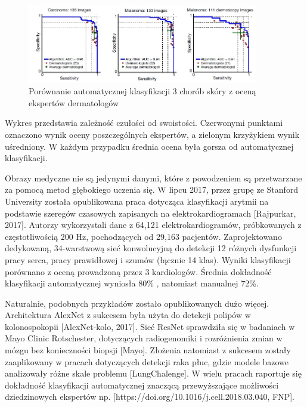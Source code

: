  \begin{figure}[h!]
 	\centering
 	\includegraphics[width=0.9\textwidth]{figures/CAD-dermatolodzy.jpg}
 	\caption{Porównanie automatycznej klasyfikacji 3 chorób skóry z oceną ekspertów dermatologów}
 	\label{CAD_derma}
 \end{figure}

Wykres przedstawia zależność czułości od swoistości. Czerwonymi punktami oznaczono wynik oceny poszczególnych ekspertów, a zielonym krzyżykiem wynik uśredniony. W każdym przypadku średnia ocena była gorsza od automatycznej klasyfikacji.

Obrazy medyczne nie są jedynymi danymi, które z powodzeniem są przetwarzane za pomocą metod głębokiego uczenia się. W lipcu 2017, przez grupę ze Stanford University została opublikowana praca dotycząca klasyfikacji arytmii na podstawie szeregów czasowych zapisanych na elektrokardiogramach [Rajpurkar, 2017]. Autorzy wykorzystali dane z 64,121 elektrokardiogramów, próbkowanych z częstotliwością 200 Hz, pochodzących od 29,163 pacjentów. Zaprojektowano dedykowaną, 34-warstwową sieć konwolucyjną do detekcji 12 różnych dysfunkcji pracy serca, pracy prawidłowej i szumów (łącznie 14 klas). Wyniki klasyfikacji porównano z oceną prowadzoną przez 3 kardiologów. Średnia dokładność klasyfikacji automatycznej wyniosła 80\% , natomiast manualnej 72\%.

Naturalnie, podobnych przykładów zostało opublikowanych dużo więcej. Architektura AlexNet z sukcesem była użyta do detekcji polipów w kolonospokopii [AlexNet-kolo, 2017]. Sieć ResNet sprawdziła się w badaniach w Mayo Clinic Rotschester, dotyczących radiogenomiki i rozróżnienia zmian w mózgu bez konieczności biopsji [Mayo]. Złożenia natomiast z sukcesem zostały zaaplikowany w pracach dotyczących detekcji raka płuc, gdzie modele bazowe analizowały różne skale problemu [LungChalenge]. W wielu pracach raportuje się dokładność klasyfikacji automatycznej znaczącą przewyższające możliwości dziedzinowych ekspertów np. [https://doi.org/10.1016/j.cell.2018.03.040, FNP].

